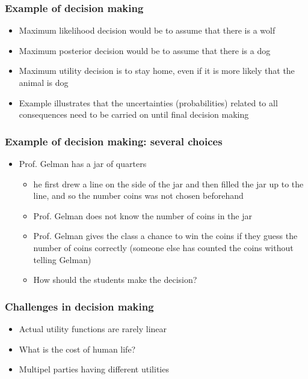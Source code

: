 \documentclass[10pt,handout]{beamer}
\begin{document}
\begin{frame}

\frametitle{Example of decision making}

  \begin{itemize}
  \item<+-> Maximum likelihood decision would be to assume that there is a wolf
  \item<+-> Maximum posterior decision would be to assume that there is a dog
  \item<+-> Maximum utility decision is to stay home, even if it is more likely that the animal is dog
  \item<+-> Example illustrates that the uncertainties (probabilities)
    related to all consequences need to be carried on until final
    decision making
  \end{itemize}

\end{frame}


\begin{frame}

\frametitle{Example of decision making: several choices}

\begin{itemize}
  \item Prof. Gelman has a jar of quarters
    \begin{itemize}
    \item he first drew a line on the side of the jar and then
      filled the jar up to the line, and so the number coins was not
      chosen beforehand
    \item Prof. Gelman does not know the number of coins in the jar
    \item<2-> Prof. Gelman gives the class a chance to win the coins if
      they guess the number of coins correctly (someone else has
      counted the coins without telling Gelman)
    \item<2-> How should the students make the decision?
    \end{itemize}
\end{itemize}

\end{frame}

\begin{frame}

\frametitle{Challenges in decision making}

  \begin{itemize}
  \item Actual utility functions are rarely linear
  \item<2-> What is the cost of human life?
  \item<3-> Multipel parties having different utilities
  \end{itemize}

\end{frame}
\end{document}
